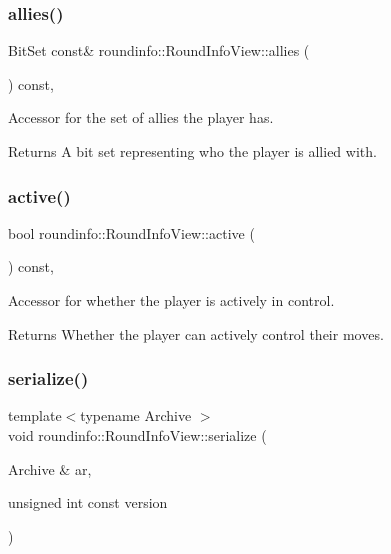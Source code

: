 \subsubsection{\texorpdfstring{allies()}{allies()}}
{\footnotesize\ttfamily Bit\+Set const\& roundinfo\+::\+Round\+Info\+View\+::allies (\begin{DoxyParamCaption}{ }\end{DoxyParamCaption}) const\hspace{0.3cm}{\ttfamily [inline]}, {\ttfamily [noexcept]}}



Accessor for the set of allies the player has. 

\begin{DoxyReturn}{Returns}
A bit set representing who the player is allied with. 
\end{DoxyReturn}
\mbox{\label{classroundinfo_1_1_round_info_view_a1ff1802f7ab8e24008f02bbc0169a160}} 
\subsubsection{\texorpdfstring{active()}{active()}}
{\footnotesize\ttfamily bool roundinfo\+::\+Round\+Info\+View\+::active (\begin{DoxyParamCaption}{ }\end{DoxyParamCaption}) const\hspace{0.3cm}{\ttfamily [inline]}, {\ttfamily [noexcept]}}



Accessor for whether the player is actively in control. 

\begin{DoxyReturn}{Returns}
Whether the player can actively control their moves. 
\end{DoxyReturn}
\mbox{\label{classroundinfo_1_1_round_info_view_a101e6ee624aacfa8dd110aea67e67538}} 
\subsubsection{\texorpdfstring{serialize()}{serialize()}}
{\footnotesize\ttfamily template$<$typename Archive $>$ \\
void roundinfo\+::\+Round\+Info\+View\+::serialize (\begin{DoxyParamCaption}\item[{Archive \&}]{ar,  }\item[{unsigned int const}]{version }\end{DoxyParamCaption})}



